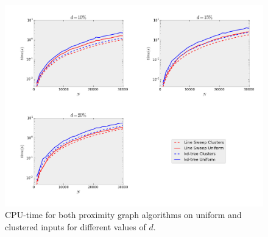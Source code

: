 \begin{figure}[!h] 
	\centering
    \includegraphics[width=0.8\linewidth]{Pictures/ls_kd_t}
    \caption[CPU-time for Line Sweep and $k$-d Tree range search.]{CPU-time for both proximity graph algorithms on uniform and clustered inputs for different values of $d$.}
    \label{fig:ls_kd_t} 
\end{figure}


